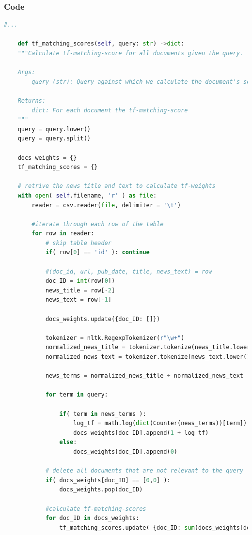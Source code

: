\documentclass[a4paper]{scrartcl}
\begin{document}
\subsubsection*{Code}
\begin{lstlisting}[language=python]
    #...
    
    def tf_matching_scores(self, query: str) ->dict:
    """Calculate tf-matching-score for all documents given the query.

    Args:
        query (str): Query against which we calculate the document's score

    Returns:
        dict: For each document the tf-matching-score 
    """
    query = query.lower()
    query = query.split()
    
    docs_weights = {}
    tf_matching_scores = {}
    
    # retrive the news title and text to calculate tf-weights
    with open( self.filename, 'r' ) as file:
        reader = csv.reader(file, delimiter = '\t')
        
        #iterate through each row of the table
        for row in reader:
            # skip table header
            if( row[0] == 'id' ): continue
            
            #(doc_id, url, pub_date, title, news_text) = row
            doc_ID = int(row[0])
            news_title = row[-2]
            news_text = row[-1]

            docs_weights.update({doc_ID: []})

            tokenizer = nltk.RegexpTokenizer(r"\w+")
            normalized_news_title = tokenizer.tokenize(news_title.lower())
            normalized_news_text = tokenizer.tokenize(news_text.lower())

            news_terms = normalized_news_title + normalized_news_text
            
            for term in query:
                
                if( term in news_terms ):
                    log_tf = math.log(dict(Counter(news_terms))[term])
                    docs_weights[doc_ID].append(1 + log_tf)
                else: 
                    docs_weights[doc_ID].append(0)
            
            # delete all documents that are not relevant to the query
            if( docs_weights[doc_ID] == [0,0] ):
                docs_weights.pop(doc_ID)

            #calculate tf-matching-scores
            for doc_ID in docs_weights:
                tf_matching_scores.update( {doc_ID: sum(docs_weights[doc_ID])} )
    

\end{lstlisting}
\end{document}
